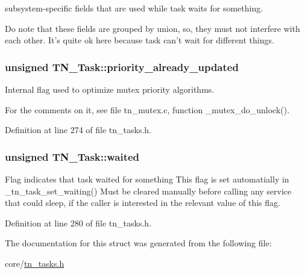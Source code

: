 subsystem-\/specific fields that are used while task waits for something. 

Do note that these fields are grouped by union, so, they must not interfere with each other. It's quite ok here because task can't wait for different things. \hypertarget{structTN__Task_abb4d22974c7317dd610f646b9048656d}{
\subsubsection[{priority\+\_\+already\+\_\+updated}]{\setlength{\rightskip}{0pt plus 5cm}unsigned T\+N\+\_\+\+Task\+::priority\+\_\+already\+\_\+updated}}\label{structTN__Task_abb4d22974c7317dd610f646b9048656d}


Internal flag used to optimize mutex priority algorithms. 

For the comments on it, see file tn\+\_\+mutex.\+c, function {\ttfamily \+\_\+mutex\+\_\+do\+\_\+unlock()}. 

Definition at line 274 of file tn\+\_\+tasks.\+h.

\hypertarget{structTN__Task_a47c3a0a27be1ee526a1599a2ca8bb269}{
\subsubsection[{waited}]{\setlength{\rightskip}{0pt plus 5cm}unsigned T\+N\+\_\+\+Task\+::waited}}\label{structTN__Task_a47c3a0a27be1ee526a1599a2ca8bb269}


Flag indicates that task waited for something This flag is set automatially in {\ttfamily \+\_\+tn\+\_\+task\+\_\+set\+\_\+waiting()} Must be cleared manually before calling any service that could sleep, if the caller is interested in the relevant value of this flag. 



Definition at line 280 of file tn\+\_\+tasks.\+h.



The documentation for this struct was generated from the following file\+:\begin{DoxyCompactItemize}
\item 
core/\hyperlink{tn__tasks_8h}{tn\+\_\+tasks.\+h}\end{DoxyCompactItemize}
